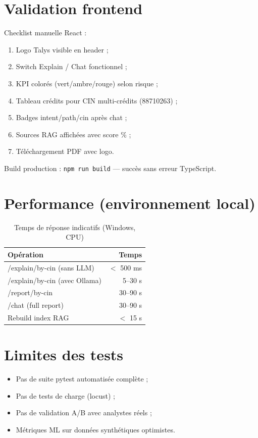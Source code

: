\section{Validation frontend}

Checklist manuelle React :
\begin{enumerate}[leftmargin=*]
  \item Logo Talys visible en header ;
  \item Switch Explain / Chat fonctionnel ;
  \item KPI colorés (vert/ambre/rouge) selon risque ;
  \item Tableau crédits pour CIN multi-crédits (88710263) ;
  \item Badges intent/path/cin après chat ;
  \item Sources RAG affichées avec score \% ;
  \item Téléchargement PDF avec logo.
\end{enumerate}

Build production : \texttt{npm run build} — succès sans erreur TypeScript.

\section{Performance (environnement local)}

\begin{table}[H]
  \centering
  \caption{Temps de réponse indicatifs (Windows, CPU)}
  \begin{tabular}{|l|r|}
    \hline
    \textbf{Opération} & \textbf{Temps} \\
    \hline
    /explain/by-cin (sans LLM) & $<$ 500 ms \\
    \hline
    /explain/by-cin (avec Ollama) & 5--30 s \\
    \hline
    /report/by-cin & 30--90 s \\
    \hline
    /chat (full report) & 30--90 s \\
    \hline
    Rebuild index RAG & $<$ 15 s \\
    \hline
  \end{tabular}
\end{table}

\section{Limites des tests}

\begin{itemize}[leftmargin=*]
  \item Pas de suite pytest automatisée complète ;
  \item Pas de tests de charge (locust) ;
  \item Pas de validation A/B avec analystes réels ;
  \item Métriques ML sur données synthétiques optimistes.
\end{itemize}

